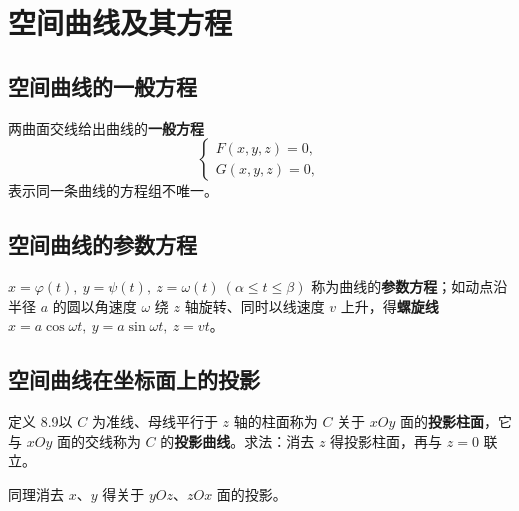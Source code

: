 
\section{空间曲线及其方程}

\subsection{空间曲线的一般方程}

两曲面交线给出曲线的\textbf{一般方程}
\begin{equation}
\begin{cases}F(x,y,z)=0,\\ G(x,y,z)=0,\end{cases}
\end{equation}
表示同一条曲线的方程组不唯一。

\subsection{空间曲线的参数方程}

$x=\varphi(t),\ y=\psi(t),\ z=\omega(t)\ (\alpha\le t\le\beta)$ 称为曲线的\textbf{参数方程}；如动点沿半径 $a$ 的圆以角速度 $\omega$ 绕 $z$ 轴旋转、同时以线速度 $v$ 上升，得\textbf{螺旋线} $x=a\cos\omega t,\ y=a\sin\omega t,\ z=vt$。

\subsection{空间曲线在坐标面上的投影}

定义 8.9\quad 以 $C$ 为准线、母线平行于 $z$ 轴的柱面称为 $C$ 关于 $xOy$ 面的\textbf{投影柱面}，它与 $xOy$ 面的交线称为 $C$ 的\textbf{投影曲线}。求法：消去 $z$ 得投影柱面，再与 $z=0$ 联立。


同理消去 $x$、$y$ 得关于 $yOz$、$zOx$ 面的投影。

